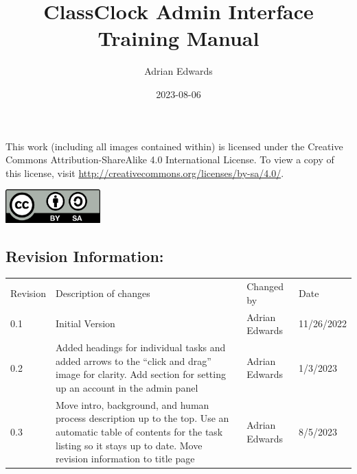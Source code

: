 \documentclass{article}
\title{ClassClock Admin Interface \\Training Manual}
\author{Adrian Edwards}
\date{2023-08-06}
\begin{document}
\makeatletter
\begin{titlepage}
    
	\begin{FlushRight}
		\vspace*{1cm}
			
		\Huge
		\textbf{\@title}
			
		\vspace{0.5cm}
		\LARGE
		\@date
			
		\vspace{1.5cm}
			
		\textbf{\@author}
	\end{FlushRight}
		
	\vfill
	\begin{center}
        
		{This work (including all images contained within) is licensed under the Creative Commons Attribution-ShareAlike 4.0
		International License. To view a copy of this license, visit \href{http://creativecommons.org/licenses/by-sa/4.0/}{http://creativecommons.org/licenses/by-sa/4.0/}.}



		\includegraphics[width=1.439in,height=0.5043in]{Mini20Manual-img001.png}
            
    \end{center}
\end{titlepage}
\makeatother

\clearpage
\large
\subsection*{Revision Information:}

\bigskip
\normalsize
\begin{FlushLeft}
	\begin{tabularx}{\textwidth}{m{3.5em}Xm{1.4233599in}m{0.8615598in}}
	{Revision} &
	{Description of changes} &
	{Changed by} &
	{Date}\\

	{0.1} &
	{Initial Version} &
	{Adrian Edwards} &
	{11/26/2022}\\

	{0.2} &
	{Added headings for individual tasks and added arrows to the “click and drag” image for
	clarity. Add section for setting up an account in the admin panel} &
	{Adrian Edwards} &
	{1/3/2023}\\

	{0.3} &
	{Move intro, background, and human process description up to the top. Use an automatic table of
	contents for the task listing so it stays up to date. Move revision information to title page} &
	{Adrian Edwards} &
	{8/5/2023}\\
\end{tabularx}
\end{FlushLeft}
\end{document}
